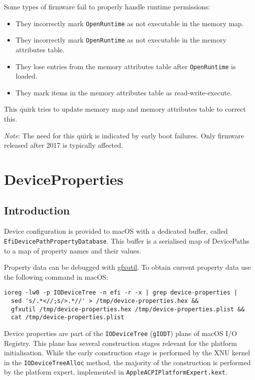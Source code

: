 \documentclass[]{article}
\providecommand{\tightlist}{%
  \setlength{\itemsep}{0pt}\setlength{\parskip}{0pt}}
\begin{document}
\begin{enumerate}
  Some types of firmware fail to properly handle runtime permissions:
  \begin{itemize}
    \tightlist
    \item They incorrectly mark \texttt{OpenRuntime} as not executable in the memory map.
    \item They incorrectly mark \texttt{OpenRuntime} as not executable in the memory
    attributes table.
    \item They lose entries from the memory attributes table after \texttt{OpenRuntime}
    is loaded.
    \item They mark items in the memory attributes table as read-write-execute.
  \end{itemize}

  This quirk tries to update memory map and memory attributes table to correct this.

  \emph{Note}: The need for this quirk is indicated by early boot failures.
  Only firmware released after 2017 is typically affected.

\end{enumerate}

\section{DeviceProperties}\label{devprops}

\subsection{Introduction}\label{devpropsintro}

Device configuration is provided to macOS with a dedicated buffer,
called \texttt{EfiDevicePathPropertyDatabase}. This buffer is a serialised
map of DevicePaths to a map of property names and their values.

Property data can be debugged with
\href{https://github.com/acidanthera/gfxutil}{gfxutil}.
To obtain current property data use the following command in macOS:
\begin{lstlisting}[label=gfxutil, style=ocbash]
ioreg -lw0 -p IODeviceTree -n efi -r -x | grep device-properties |
  sed 's/.*<//;s/>.*//' > /tmp/device-properties.hex &&
  gfxutil /tmp/device-properties.hex /tmp/device-properties.plist &&
  cat /tmp/device-properties.plist
\end{lstlisting}

Device properties are part of the \texttt{IODeviceTree} (\texttt{gIODT})
plane of macOS I/O Registry. This plane has several construction stages
relevant for the platform initialisation. While the early construction
stage is performed by the XNU kernel in the \texttt{IODeviceTreeAlloc}
method, the majority of the construction is performed by the platform expert,
implemented in \texttt{AppleACPIPlatformExpert.kext}.
\end{document}
